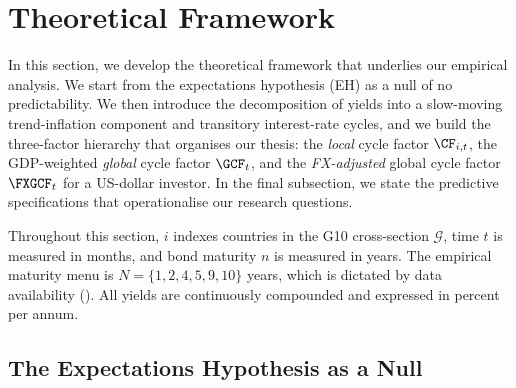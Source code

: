 \section{Theoretical Framework}
\label{ch:framework}

In this section, we develop the theoretical framework that underlies our
empirical analysis. We start from the expectations hypothesis (EH) as a null of
no predictability. We then introduce the \citet{cieslak2015} decomposition of
yields into a slow-moving trend-inflation component and transitory
interest-rate cycles, and we build the three-factor hierarchy that organises
our thesis: the \emph{local} cycle factor $\CF_{i,t}$, the GDP-weighted
\emph{global} cycle factor $\GCF_{t}$, and the \emph{FX-adjusted} global cycle
factor $\FXGCF_{t}$ for a US-dollar investor. In the final subsection, we state
the predictive specifications that operationalise our research questions.

Throughout this section, $i$ indexes countries in the G10 cross-section
$\mathcal{G}$, time $t$ is measured in months, and bond maturity $n$ is
measured in years. The empirical maturity menu is $N=\{1,2,4,5,9,10\}$ years,
which is dictated by data availability (). All yields are
continuously compounded and expressed in percent per annum.

\subsection{The Expectations Hypothesis as a Null}
\label{sec:fw-eh}

